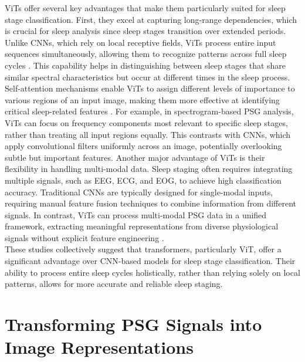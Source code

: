 ViTs offer several key advantages that make them particularly suited for sleep stage classification. First, they excel at capturing long-range dependencies, which is crucial for sleep analysis since sleep stages transition over extended periods. Unlike CNNs, which rely on local receptive fields, ViTs process entire input sequences simultaneously, allowing them to recognize patterns across full sleep cycles \parencite{kazemi2025multimodal}. This capability helps in distinguishing between sleep stages that share similar spectral characteristics but occur at different times in the sleep process. \\

Self-attention mechanisms enable ViTs to assign different levels of importance to various regions of an input image, making them more effective at identifying critical sleep-related features \parencite{lee2025explainable}. For example, in spectrogram-based PSG analysis, ViTs can focus on frequency components most relevant to specific sleep stages, rather than treating all input regions equally. This contrasts with CNNs, which apply convolutional filters uniformly across an image, potentially overlooking subtle but important features. Another major advantage of ViTs is their flexibility in handling multi-modal data. Sleep staging often requires integrating multiple signals, such as EEG, ECG, and EOG, to achieve high classification accuracy. Traditional CNNs are typically designed for single-modal inputs, requiring manual feature fusion techniques to combine information from different signals. In contrast, ViTs can process multi-modal PSG data in a unified framework, extracting meaningful representations from diverse physiological signals without explicit feature engineering \parencite{kazemi2025multimodal}.\\

These studies collectively suggest that transformers, particularly ViT, offer a significant advantage over CNN-based models for sleep stage classification. Their ability to process entire sleep cycles holistically, rather than relying solely on local patterns, allows for more accurate and reliable sleep staging.  \\


\section{Transforming PSG Signals into Image Representations}
\label{lit:3}

